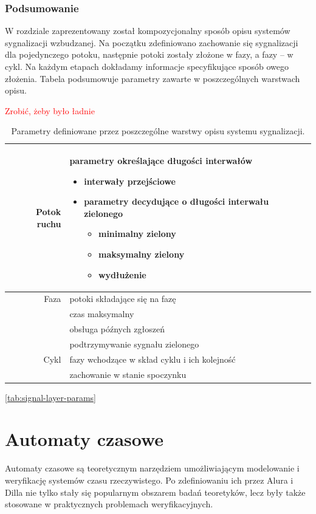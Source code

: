 \documentclass{pracamgr}
\newcommand{\todo}[1]{\textcolor{red}{#1}}
\theoremstyle{plain}
\begin{document}
\subsection{Podsumowanie}

W rozdziale zaprezentowany został kompozycjonalny sposób opisu
systemów sygnalizacji wzbudzanej. Na początku zdefiniowano zachowanie
się sygnalizacji dla pojedynczego potoku, następnie potoki zostały
złożone w fazy, a fazy -- w cykl. Na każdym etapach dokładamy
informacje specyfikujące sposób owego złożenia.
Tabela \label{tab:signal-layer-params} podsumowuje parametry zawarte w
poszczególnych warstwach opisu.

\todo{Zrobić, żeby było ładnie}
\begin{table}[ht] \centering
  \begin{tabular}{|r|p{8cm}|} \hline Potok ruchu & parametry
określające długości interwałów
    \begin{itemize}
      \item interwały przejściowe
      \item parametry decydujące o długości interwału zielonego
      \begin{itemize}
        \item minimalny zielony
        \item maksymalny zielony
        \item wydłużenie
      \end{itemize}
    \end{itemize} \\\hline Faza & potoki składające się na fazę \\ &
czas maksymalny \\ & obsługa późnych zgłoszeń \\ & podtrzymywanie
sygnału zielonego \\\hline Cykl & fazy wchodzące w skład cyklu i ich
kolejność \\ & zachowanie w stanie spoczynku\\\hline
  \end{tabular}
  \caption{Parametry definiowane przez poszczególne warstwy opisu
systemu sygnalizacji.}  \ref{tab:signal-layer-params}
\end{table}

\chapter{Automaty czasowe}
\label{c:ta} Automaty czasowe są teoretycznym narzędziem
umożliwiającym modelowanie i weryfikację systemów czasu
rzeczywistego. Po zdefiniowaniu ich przez Alura i Dilla nie tylko
stały się popularnym obszarem badań teoretyków, lecz były także
stosowane w praktycznych problemach weryfikacyjnych.
\end{document}
